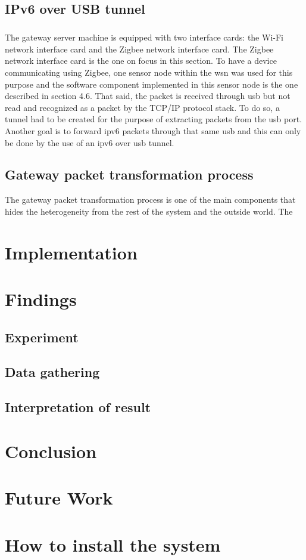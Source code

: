 \documentclass[oneside,12pt,a4paper,final]{book}
\begin{document}
\section{IPv6 over USB tunnel}
\paragraph{}
The gateway server machine is equipped with two interface cards: the Wi-Fi network interface card and the Zigbee network interface card. The Zigbee network interface card is the one on focus in this section. To have a device communicating using Zigbee, one sensor node within the \gls{wsn} was used for this purpose and the software component implemented in this sensor node is the one described in section 4.6. That said, the packet is received through \gls{usb} but not read and recognized as a packet by the TCP/IP protocol stack. To do so, a tunnel had to be created for the purpose of extracting packets from the \gls{usb} port. Another goal is to forward \gls{ipv6} packets through that same \gls{usb} and this can only be done by the use of an \gls{ipv6} over \gls{usb} tunnel. 

\section{Gateway packet transformation process}
The gateway packet transformation process is one of the main components that hides the heterogeneity from the rest of the system and the outside world. The 

\chapter{Implementation}

\chapter{Findings}
\section{Experiment}
\section{Data gathering}
\section{Interpretation of result}

\chapter{Conclusion}

\chapter{Future Work}

\appendix
\chapter{How to install the system}

\backmatter

\singlespacing
\printglossaries
 

\end{document}
